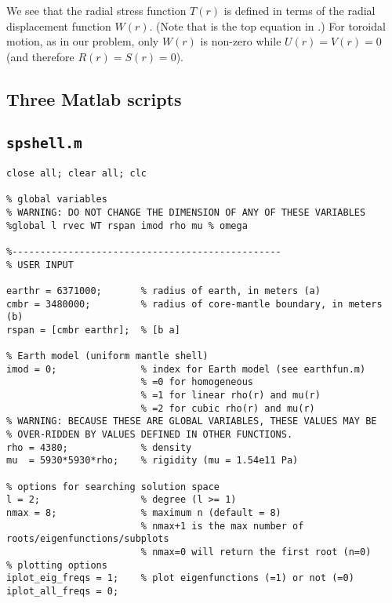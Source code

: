 \documentclass[11pt,titlepage,fleqn]{article}
\begin{document}
We see that the radial stress function $T(r)$ is defined in terms of the radial displacement function $W(r)$. (Note that  is the top equation in .) For toroidal motion, as in our problem, only $W(r)$ is non-zero while $U(r) = V(r) = 0$ (and therefore $R(r) = S(r) = 0$).



\normalsize


\begin{spacing}{1.0}

\section{Three Matlab scripts}

\subsection{\tt spshell.m}
\label{sec:shell}

\small
\begin{verbatim}
close all; clear all; clc

% global variables
% WARNING: DO NOT CHANGE THE DIMENSION OF ANY OF THESE VARIABLES
%global l rvec WT rspan imod rho mu % omega

%------------------------------------------------
% USER INPUT

earthr = 6371000;       % radius of earth, in meters (a)
cmbr = 3480000;         % radius of core-mantle boundary, in meters (b)
rspan = [cmbr earthr];  % [b a]

% Earth model (uniform mantle shell)
imod = 0;               % index for Earth model (see earthfun.m)
                        % =0 for homogeneous
                        % =1 for linear rho(r) and mu(r)
                        % =2 for cubic rho(r) and mu(r)
% WARNING: BECAUSE THESE ARE GLOBAL VARIABLES, THESE VALUES MAY BE
% OVER-RIDDEN BY VALUES DEFINED IN OTHER FUNCTIONS.                        
rho = 4380;             % density
mu  = 5930*5930*rho;    % rigidity (mu = 1.54e11 Pa)

% options for searching solution space
l = 2;                  % degree (l >= 1)
nmax = 8;               % maximum n (default = 8)
                        % nmax+1 is the max number of roots/eigenfunctions/subplots
                        % nmax=0 will return the first root (n=0)
% plotting options                        
iplot_eig_freqs = 1;    % plot eigenfunctions (=1) or not (=0)
iplot_all_freqs = 0;


\end{verbatim}
\end{spacing}
\end{document}

